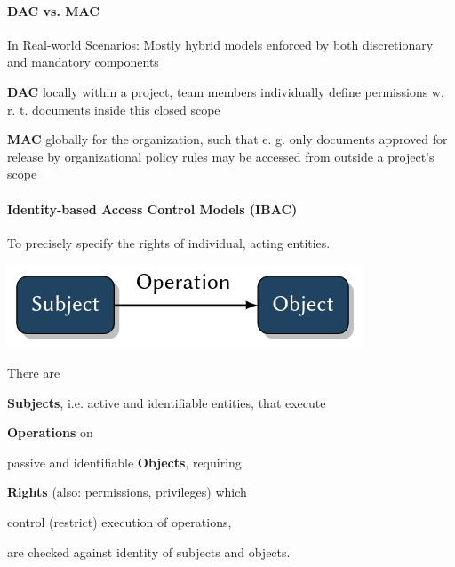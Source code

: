 \documentclass[a4paper]{article}
\begin{document}
\begin{multicols}{3}
    \paragraph{DAC vs. MAC}
    In Real-world Scenarios: Mostly hybrid models enforced by both discretionary and mandatory components
    \begin{itemize*}
        \item \textbf{DAC} locally within a project, team members individually define permissions w. r. t. documents inside this closed scope
        \item \textbf{MAC} globally for the organization, such that e. g. only documents approved for release by organizational policy rules may be accessed from outside a project’s scope
    \end{itemize*}

    \paragraph{Identity-based Access Control Models (IBAC)}
    To precisely specify the rights of individual, acting entities.
    \begin{center}
        \includegraphics[width=.5\linewidth]{Assets/Systemsicherheit-ibac-basic.png}
    \end{center}
    There are
    \begin{itemize*}
        \item \textbf{Subjects}, i.e. active and identifiable entities, that execute
        \item \textbf{Operations} on
        \item passive and identifiable \textbf{Objects}, requiring
        \item \textbf{Rights} (also: permissions, privileges) which
        \begin{itemize*}
            \item control (restrict) execution of operations,
            \item are checked against identity of subjects and objects.
        \end{itemize*}
    \end{itemize*}


\end{multicols}
\end{document}

